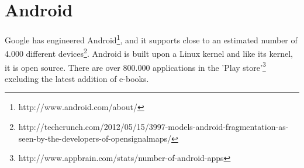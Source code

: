 \section{Android}
Google has engineered Android\footnote{http://www.android.com/about/}, and it supports close to an estimated number of 4.000 different devices\footnote{http://techcrunch.com/2012/05/15/3997-models-android-fragmentation-as-seen-by-the-developers-of-opensignalmaps/}. Android is built upon a Linux kernel and like its kernel, it is open source. There are over 800.000 applications in the 'Play store'\footnote{http://www.appbrain.com/stats/number-of-android-apps} excluding the latest addition of e-books.
